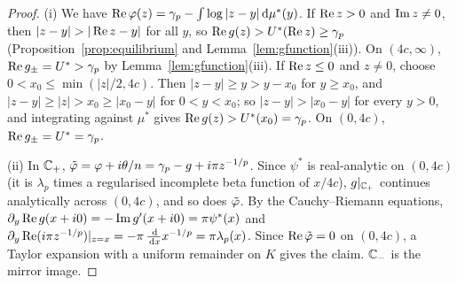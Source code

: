 \begin{proof}
(i) We have $\operatorname{Re}\varphi(z)=\gamma_p-\int\log|z-y|\,\mathrm{d}\mu^*(y)$. If $\operatorname{Re} z>0$ and $\operatorname{Im} z\ne0$, then
$|z-y|>|\re z-y|$ for all $y$, so $\operatorname{Re} g(z)>U^*(\operatorname{Re} z)\ge\gamma_p$ (Proposition~\ref{prop:equilibrium} and
Lemma~\ref{lem:gfunction}(iii)). On $(4c,\infty)$, $\operatorname{Re} g_\pm=U^*>\gamma_p$ by Lemma~\ref{lem:gfunction}(iii). If
$\operatorname{Re} z\le0$ and $z\ne0$, choose $0<x_0\le\min(|z|/2,4c)$. Then $|z-y|\ge y>y-x_0$ for $y\ge x_0$, and
$|z-y|\ge|z|>x_0\ge|x_0-y|$ for $0<y<x_0$; so $|z-y|>|x_0-y|$ for every $y>0$, and integrating against $\mu^*$ gives
$\operatorname{Re} g(z)>U^*(x_0)=\gamma_p$. On $(0,4c)$, $\operatorname{Re} g_\pm=U^*=\gamma_p$.

(ii) In $\mathbb{C}_+$, $\tilde\varphi=\varphi+i\theta/n=\gamma_p-g+i\pi z^{-1/p}$. Since $\psi^*$ is real-analytic on $(0,4c)$ (it is
$\lambda_p$ times a regularised incomplete beta function of $x/4c$), $g|_{\mathbb{C}_+}$ continues analytically across
$(0,4c)$, and so does $\tilde\varphi$. By the Cauchy--Riemann equations, $\partial_y\operatorname{Re} g(x+i0)=-\operatorname{Im} g'(x+i0)=\pi\psi^*(x)$
and $\partial_y\operatorname{Re}(i\pi z^{-1/p})|_{z=x}=-\pi\,\frac{\,\mathrm{d}}{\,\mathrm{d} x}x^{-1/p}=\pi\lambda_p(x)$. Since $\operatorname{Re}\tilde\varphi=0$ on
$(0,4c)$, a Taylor expansion with a uniform remainder on $K$ gives the claim. $\mathbb{C}_-$ is the mirror image.


\end{proof}
